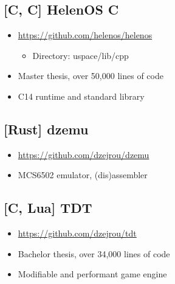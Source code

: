 \documentclass[8pt]{article}
\def\cpp{{C\nolinebreak[4]\hspace{-.05em}\raisebox{.4ex}{\tiny\bf ++\xspace}}}
\begin{document}
\begin{minipage}[t]{0.45\textwidth}
    \centering

    \subsection*{[C, \cpp] HelenOS \cpp}
    \begin{itemize}
        \item \url{https://github.com/helenos/helenos}
        \begin{itemize}
            \item Directory: uspace/lib/cpp
        \end{itemize}
        \item Master thesis, over 50,000 lines of code
        \item \cpp14 runtime and standard library
    \end{itemize}

    \subsection*{[Rust] dzemu}
    \begin{itemize}
        \item \url{https://github.com/dzejrou/dzemu}
        \item MCS6502 emulator, (dis)assembler
    \end{itemize}

    \subsection*{[\cpp, Lua] TDT}
    \begin{itemize}
        \item \url{https://github.com/dzejrou/tdt}
        \item Bachelor thesis, over 34,000 lines of code
        \item Modifiable and performant game engine
    \end{itemize}
\end{minipage}%
\hfill
\end{document}
